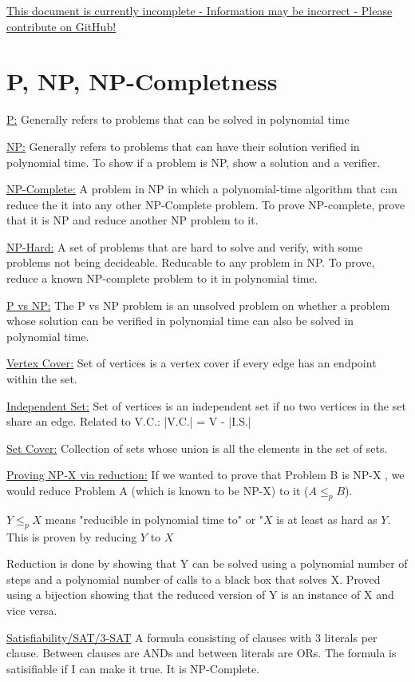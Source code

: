\documentclass{article}
\begin{document}
\underline{This document is currently incomplete - Information may be incorrect - Please contribute on GitHub!}

\section{P, NP, NP-Completness}

\underline{P:} Generally refers to problems that can be solved in polynomial time

\underline{NP:} Generally refers to problems that can have their solution verified in polynomial time. To show if a problem is NP, show a solution and a verifier.

\underline{NP-Complete:} A problem in NP in which a polynomial-time algorithm that can reduce
the it into any other NP-Complete problem. To prove NP-complete, prove that it is NP and reduce another NP problem to it.

\underline{NP-Hard:} A set of problems that are hard to solve and verify, with some problems not being decideable. Reducable to any problem in NP. To prove, reduce a known NP-complete problem to it in polynomial time.

\underline{P vs NP:} The P vs NP problem is an unsolved problem on whether a problem whose solution can be
verified in polynomial time can also be solved in polynomial time. 

\underline{Vertex Cover:} Set of vertices is a vertex cover if every edge has an endpoint within the
set.

\underline{Independent Set:} Set of vertices is an independent set if no two vertices in the set
share an edge. Related to V.C.: |V.C.| = V - |I.S.|

\underline{Set Cover:} Collection of sets whose union is all the elements in the set of sets.


\underline{Proving NP-X via reduction:} If we wanted to prove that Problem B is NP-X
, we would reduce Problem A (which is known to be NP-X) to it ($A \leq_p B$). 

$Y \le_p X$ means "reducible in polynomial time to" or "$X$ is at least as hard as $Y$. This is proven by reducing $Y$ to $X$

Reduction is done by showing that Y can be solved using a polynomial number of steps and a
polynomial number of calls to a black box that solves X. Proved using a bijection showing that the
reduced version of Y is an instance of X and vice versa.

\underline{Satisfiability/SAT/3-SAT} A formula consisting of clauses with 3 literals per clause.
Between clauses are ANDs and between literals are ORs. The formula is satisifiable if I can make it
true. It is NP-Complete.
\end{document}
